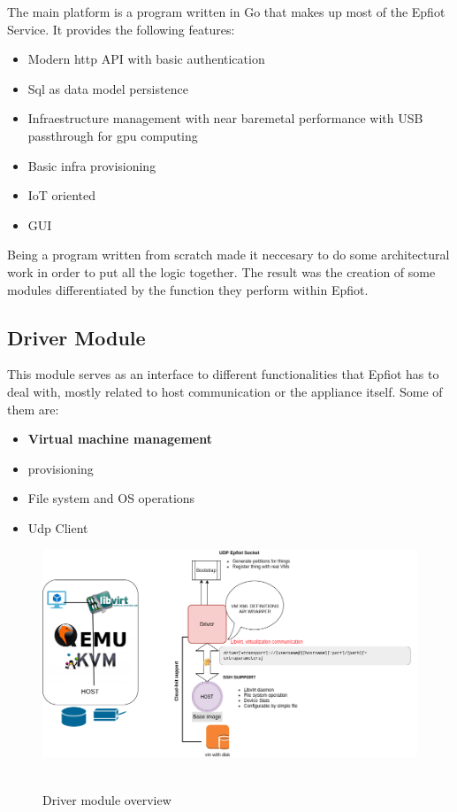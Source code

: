 The main platform is a program written in Go that makes up most of the Epfiot Service.
It provides the following features:
\begin{itemize}
    \item Modern http API with basic authentication
    \item Sql as data model persistence
    \item Infraestructure management with near baremetal performance with USB passthrough for gpu computing
    \item Basic infra provisioning
    \item IoT oriented
    \item GUI
\end{itemize}

Being a program written from scratch made it neccesary to do some architectural work in order to put all the logic together. The result was the creation of some modules differentiated by the function they perform within Epfiot.

\newpage
\subsection{Driver Module}
This module serves as an interface to different functionalities that Epfiot has to deal with, mostly related to host communication or the appliance itself. Some of them are:
\begin{itemize}
    \item \textbf{Virtual machine management}
    \item provisioning
    \item File system and OS operations
    \item Udp Client
\end{itemize}

\begin{figure}[h!]%
\centering
    \includegraphics[width=6.0in]{figures/driver.png}
~\caption{Driver module overview}
\label{figure4.2}
\end{figure}

